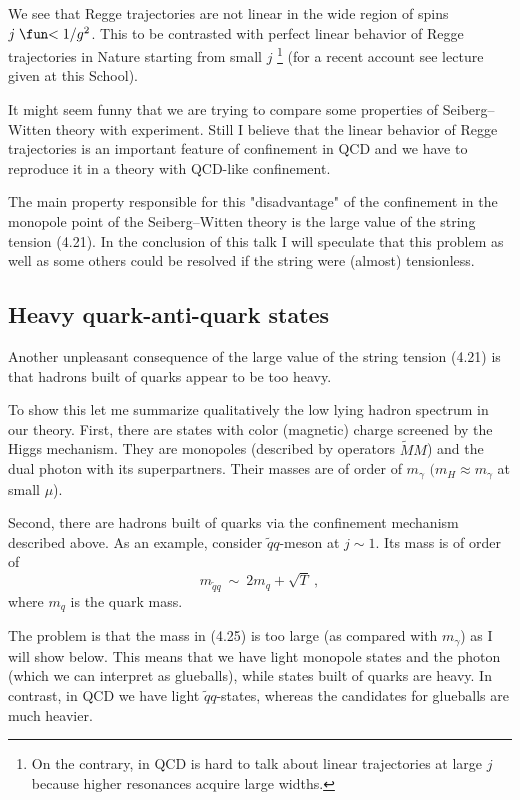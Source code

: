 \documentclass[a4paper,12pt]{article}
\def\la{\mathrel{\mathpalette\fun <}}
\def\fun#1#2{\lower3.6pt\vbox{\baselineskip0pt\lineskip.9pt
\ialign{$\mathsurround=0pt#1\hfil##\hfil$\crcr#2\crcr\sim\crcr}}}
\begin{document}
We see that Regge trajectories are not linear in the wide region
of spins $j\la1/g^2$. This to be contrasted with perfect
linear behavior of Regge trajectories in Nature
starting from
small $j$ \footnote{ On the contrary, in QCD is  hard to
talk about linear trajectories at large $j$ because higher
resonances acquire large widths.} (for a recent account see
lecture \cite{Anis} given
at this School).

 It might seem funny that we are trying to
compare some properties of Seiberg--Witten theory with
experiment.   Still I believe that the linear behavior of Regge
trajectories is an important feature of 
confinement in QCD and we have to reproduce it in a theory
with QCD-like confinement.

The main property responsible for this "disadvantage" of the
confinement in the monopole point of the Seiberg--Witten theory
is the large value of the string tension (4.21). In the
conclusion of this talk I will speculate that this problem as
well as some others could be resolved if the string were
(almost) tensionless.

\subsection{Heavy quark-anti-quark states}

Another unpleasant consequence of the large value of the string
tension (4.21) is that hadrons built of quarks appear to be too
heavy.

To show this let me summarize qualitatively the low lying hadron
spectrum in our theory. First,  there are states with color
(magnetic) charge screened by the Higgs mechanism. They are
monopoles (described by operators
$\widetilde MM$) and the dual photon with its superpartners.
Their masses are of order of $m_\gamma$ $(m_H\approx m_\gamma$
at small $\mu $).

Second, there are hadrons built of quarks via the confinement
mechanism described above. As an example, consider
 $\tilde qq$-meson at $j\sim1$. Its mass is of order of
\begin{equation}
m_{\tilde qq}\ \sim\ 2m_q+\sqrt T\ ,
\end{equation}
where $m_q$ is the quark mass.

The problem is that the mass in (4.25) is too large (as compared with
$m_\gamma$) as I will show below. This means that we have
light monopole states and the photon (which we can
interpret  as glueballs), while states built of quarks are
heavy.  In contrast, in QCD we have light $\tilde qq$-states,
whereas the candidates for glueballs are much heavier.
\end{document}
